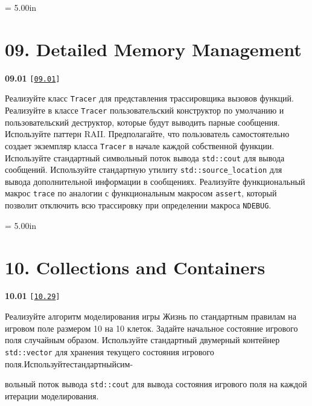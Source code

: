 \documentclass[a4paper,12pt]{article}
\begin{document}
\newpage\thispagestyle{empty}\pdfpageheight = 5.00in\enlargethispage{100in}

\section{09. Detailed Memory Management}

{\large \textbf{09.01} \texttt{[\href{https://github.com/i-s-m-mipt/Education/blob/master/projects/examples/source/09.01.cpp}{\texttt{09.01}}]}}

\bigskip

Реализуйте класс \lstinline{Tracer} для представления трассировщика вызовов функций. Реализуйте в классе \lstinline{Tracer} пользовательский конструктор по умолчанию и пользовательский деструктор, которые будут выводить парные сообщения. Используйте паттерн RAII. Предполагайте, что пользователь самостоятельно создает экземпляр класса \lstinline{Tracer} в начале каждой собственной функции. Используйте стандартный символьный поток вывода \lstinline{std::cout} для вывода сообщений. Используйте стандартную утилиту \lstinline{std::source_location} для вывода дополнительной информации в сообщениях. Реализуйте функциональный макрос \lstinline{trace} по аналогии с функциональным макросом \lstinline{assert}, который позволит отключить всю трассировку при определении макроса \lstinline{NDEBUG}.



\newpage\thispagestyle{empty}\pdfpageheight = 5.00in\enlargethispage{100in}

\section{10. Collections and Containers}

{\large \textbf{10.01} \texttt{[\href{https://github.com/i-s-m-mipt/Education/blob/master/projects/examples/source/10.29.cpp}{\texttt{10.29}}]}}

\bigskip

Реализуйте алгоритм моделирования игры Жизнь по стандартным правилам на игровом поле размером 10 на 10 клеток. Задайте начальное состояние игрового поля случайным образом. Используйте стандартный двумерный контейнер \lstinline{std::vector} для хранения текущего состояния игрового поля.\:Используйте\:стандартный\:сим- 

вольный поток вывода \lstinline{std::cout} для вывода состояния игрового поля на каждой итерации моделирования.

\bigskip
\end{document}
